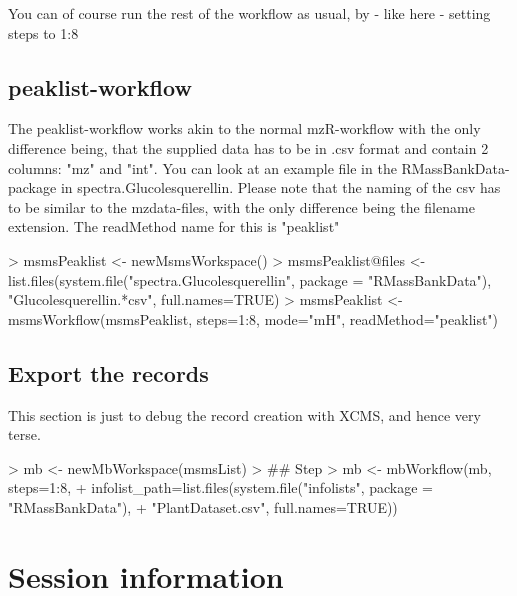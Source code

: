 \documentclass[letterpaper, 11pt]{article}
\begin{document}
You can of course run the rest of the workflow as usual, by - like here - setting steps to 1:8

\subsection{peaklist-workflow}

The peaklist-workflow works akin to the normal mzR-workflow with the only difference being, that the supplied data has to be in .csv format and contain 2 columns: "mz" and "int".
You can look at an example file in the RMassBankData-package in spectra.Glucolesquerellin. Please note that the naming of the csv has to be similar to the mzdata-files, with the only difference being the filename extension.
The readMethod name for this is "peaklist"

\begin{Schunk}
\begin{Sinput}
> 	msmsPeaklist <- newMsmsWorkspace()
> 	msmsPeaklist@files <- list.files(system.file("spectra.Glucolesquerellin", package = "RMassBankData"), "Glucolesquerellin.*csv", full.names=TRUE)
> 	msmsPeaklist <- msmsWorkflow(msmsPeaklist, steps=1:8, mode="mH", readMethod="peaklist")
\end{Sinput}
\end{Schunk}

\subsection{Export the records}

This section is just to debug the record creation with XCMS, and hence very terse.


\begin{Schunk}
\begin{Sinput}
> mb <- newMbWorkspace(msmsList)
> ## Step 
> mb <- mbWorkflow(mb, steps=1:8, 
+                  infolist_path=list.files(system.file("infolists", package = "RMassBankData"), 
+                    "PlantDataset.csv", full.names=TRUE))
\end{Sinput}
\end{Schunk}




\section{Session information}
\end{document}
